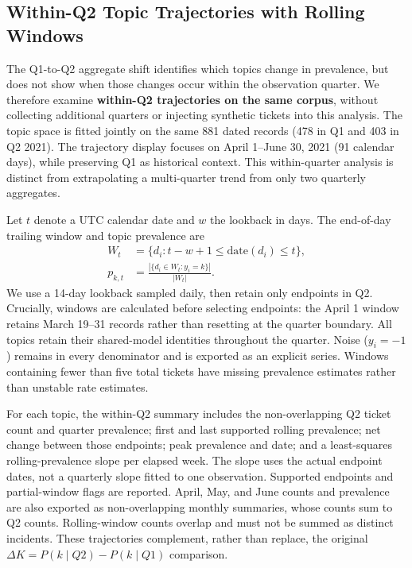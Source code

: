 \subsection{Within-Q2 Topic Trajectories with Rolling Windows}
\label{sec:rolling_trajectories}
The Q1-to-Q2 aggregate shift identifies which topics change in prevalence, but does not show when those changes occur within the observation quarter. We therefore examine \textbf{within-Q2 trajectories on the same corpus}, without collecting additional quarters or injecting synthetic tickets into this analysis. The topic space is fitted jointly on the same 881 dated records (478 in Q1 and 403 in Q2 2021). The trajectory display focuses on April 1--June 30, 2021 (91 calendar days), while preserving Q1 as historical context. This within-quarter analysis is distinct from extrapolating a multi-quarter trend from only two quarterly aggregates.

Let $t$ denote a UTC calendar date and $w$ the lookback in days. The end-of-day trailing window and topic prevalence are
\begin{equation}
\begin{aligned}
 W_t &= \{d_i : t-w+1 \leq \mathrm{date}(d_i) \leq t\},\\
 p_{k,t} &= \frac{|\{d_i \in W_t : y_i=k\}|}{|W_t|}.
\end{aligned}
\end{equation}
We use a 14-day lookback sampled daily, then retain only endpoints in Q2. Crucially, windows are calculated before selecting endpoints: the April 1 window retains March 19--31 records rather than resetting at the quarter boundary. All topics retain their shared-model identities throughout the quarter. Noise ($y_i=-1$) remains in every denominator and is exported as an explicit series. Windows containing fewer than five total tickets have missing prevalence estimates rather than unstable rate estimates.

For each topic, the within-Q2 summary includes the non-overlapping Q2 ticket count and quarter prevalence; first and last supported rolling prevalence; net change between those endpoints; peak prevalence and date; and a least-squares rolling-prevalence slope per elapsed week. The slope uses the actual endpoint dates, not a quarterly slope fitted to one observation. Supported endpoints and partial-window flags are reported. April, May, and June counts and prevalence are also exported as non-overlapping monthly summaries, whose counts sum to Q2 counts. Rolling-window counts overlap and must not be summed as distinct incidents. These trajectories complement, rather than replace, the original $\Delta K=P(k\mid Q2)-P(k\mid Q1)$ comparison.

